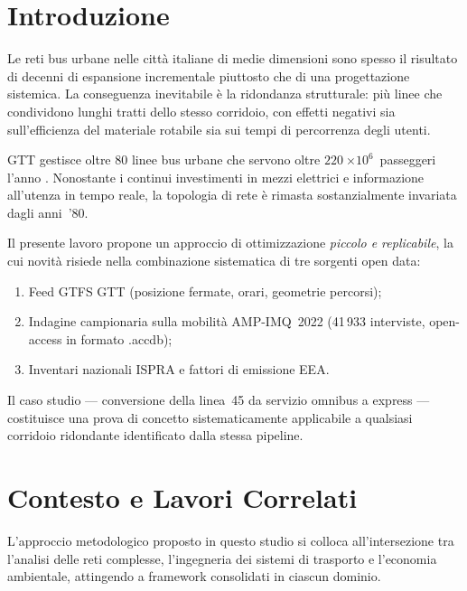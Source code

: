 \documentclass[conference]{IEEEtran}
\begin{document}
\section{Introduzione}
\label{sec:intro}

Le reti bus urbane nelle città italiane di medie dimensioni sono
spesso il risultato di decenni di espansione incrementale piuttosto
che di una progettazione sistemica. La conseguenza inevitabile è la
ridondanza strutturale: più linee che condividono lunghi tratti dello
stesso corridoio, con effetti negativi sia sull'efficienza del
materiale rotabile sia sui tempi di percorrenza degli utenti.

GTT gestisce oltre 80 linee bus urbane che servono oltre
$\SI{220}{\times10^6}$~passeggeri l'anno \cite{gtt2022}. Nonostante
i continui investimenti in mezzi elettrici e informazione
all'utenza in tempo reale, la topologia di rete è rimasta
sostanzialmente invariata dagli anni~'80.

Il presente lavoro propone un approccio di ottimizzazione
\emph{piccolo e replicabile}, la cui novità risiede nella
combinazione sistematica di tre sorgenti open data:
\begin{enumerate}
  \item Feed GTFS GTT (posizione fermate, orari, geometrie percorsi);
  \item Indagine campionaria sulla mobilità AMP-IMQ~2022
        (41\,933 interviste, open-access in formato .accdb);
  \item Inventari nazionali ISPRA e fattori di emissione EEA.
\end{enumerate}

Il caso studio — conversione della linea~45 da servizio omnibus a
express — costituisce una prova di concetto sistematicamente
applicabile a qualsiasi corridoio ridondante identificato dalla
stessa pipeline.

\section{Contesto e Lavori Correlati}
\label{sec:background}

L'approccio metodologico proposto in questo studio si colloca all'intersezione tra l'analisi delle reti complesse, l'ingegneria dei sistemi di trasporto e l'economia ambientale, attingendo a framework consolidati in ciascun dominio.
\end{document}
